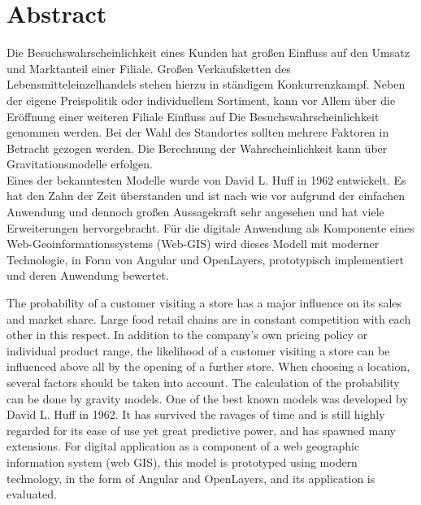 \chapter*{Abstract}
Die Besuchswahrscheinlichkeit eines Kunden hat großen Einfluss auf den Umsatz und Marktanteil einer Filiale.
Großen Verkaufsketten des Lebensmitteleinzelhandels stehen hierzu in ständigem Konkurrenzkampf.
Neben der eigene Preispolitik oder individuellem Sortiment, kann vor Allem über die Eröffnung einer weiteren Filiale Einfluss auf Die Besuchswahrscheinlichkeit genommen werden.
Bei der Wahl des Standortes sollten mehrere Faktoren in Betracht gezogen werden.
Die Berechnung der Wahrscheinlichkeit kann über Gravitationsmodelle  erfolgen.\\
Eines der bekanntesten Modelle wurde von David L. Huff in 1962 entwickelt.
Es hat den Zahn der Zeit überstanden und ist nach wie vor aufgrund der einfachen Anwendung und dennoch großen Aussagekraft sehr angesehen und hat viele Erweiterungen hervorgebracht.
Für die digitale Anwendung als Komponente eines Web-Geoinformationssystems (Web-GIS) wird dieses Modell mit moderner Technologie, in Form von Angular und OpenLayers, prototypisch implementiert und deren Anwendung bewertet.

The probability of a customer visiting a store has a major influence on its sales and market share.
Large food retail chains are in constant competition with each other in this respect.
In addition to the company's own pricing policy or individual product range, the likelihood of a customer visiting a store can be influenced above all by the opening of a further store.
When choosing a location, several factors should be taken into account.
The calculation of the probability can be done by gravity models.
One of the best known models was developed by David L. Huff in 1962.
It has survived the ravages of time and is still highly regarded for its ease of use yet great predictive power, and has spawned many extensions.
For digital application as a component of a web geographic information system (web GIS), this model is prototyped using modern technology, in the form of Angular and OpenLayers, and its application is evaluated.

